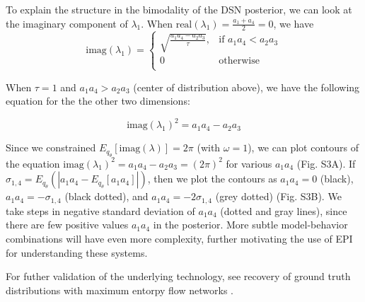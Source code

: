 \documentclass[11pt]{article}
\begin{document}
To explain the structure in the bimodality of the DSN posterior, we can look at the imaginary component of $\lambda_1$.  When $\text{real}(\lambda_1) = \frac{a_1 + a_4}{2} = 0$, we have
\begin{equation}
\text{imag}(\lambda_1) = \begin{cases}
                             \sqrt{\frac{a_1 a_4 - a_2 a_3}{\tau}},  & \text{if } a_1 a_4 < a_2 a_3 \\
                             0 & \text{otherwise } \\
                         \end{cases} 
\end{equation}

When $\tau=1$ and $a_1 a_4 > a_2 a_3$ (center of distribution above), we have the following equation for the the other two dimensions:

\begin{equation}
\text{imag}(\lambda_1)^2 = a_1 a_4 - a_2 a_3
\end{equation}

Since we constrained $E_{q_\theta}\left[\text{imag}(\lambda)\right] = 2 \pi$ (with $\omega=1$), we can plot contours of the equation $\text{imag}(\lambda_1)^2 = a_1 a_4 - a_2 a_3 = (2 \pi)^2$ for various $a_1 a_4$ (Fig. S3A). If $\sigma_{1,4} = E_{q_\theta}(|a_1 a_4 - E_{q_\theta}[a_1 a_4]|)$, then we plot the contours as $a_1 a_4 = 0$ (black), $a_1 a_4 = -\sigma_{1,4}$ (black dotted), and $a_1 a_4 = -2\sigma_{1,4}$ (grey dotted) (Fig. S3B).  We take steps in negative standard deviation of $a_1 a_4$ (dotted and gray lines), since there are few positive values $a_1 a_4$ in the posterior.  More subtle model-behavior combinations will have even more complexity, further motivating the use of EPI for understanding these systems.

For futher validation of the underlying technology, see recovery of ground truth distributions with maximum entorpy flow networks \cite{loaiza2017maximum}.
\end{document}
